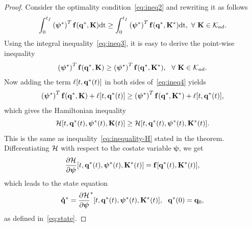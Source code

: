 \documentclass[
12pt,draftcls,onecolumn%
]{IEEEtran}
\begin{document}
\begin{proof}
Consider the optimality condition~\eqref{eq:ineq2} and rewriting it as follows
\begin{equation}
\begin{split}
\int_{0}^{t_f} \left(\boldsymbol{\psi}^*\right)^T{\bf f}({\bf q}^*,{\bf K})\mathrm{dt} \geq
\int_{0}^{t_f} \left(\boldsymbol{\psi}^*\right)^T{\bf f}({\bf q}^*,{\bf K}^*)\mathrm{dt},~\forall~{\bf K}\in {\cal K}_{ad}.
\end{split}
\label{eq:ineq3}
\end{equation}
Using the integral inequality~\eqref{eq:ineq3}, it is easy to derive the point-wise inequality~\cite{Ahmed2006}
\begin{equation}
\begin{split}
\left(\boldsymbol{\psi}^*\right)^T{\bf f}({\bf q}^*,{\bf K}) \geq
\left(\boldsymbol{\psi}^*\right)^T{\bf f}({\bf q}^*,{\bf K}^*),~~\forall~{\bf K}\in {\cal K}_{ad}.
\end{split}
\label{eq:ineq4}
\end{equation}
Now adding the term $\ell[t,{\bf q}^*(t)]$ in both sides of~\eqref{eq:ineq4} yields
%
\begin{equation*}
\begin{split}
\left(\boldsymbol{\psi}^*\right)^T{\bf f}({\bf q}^*,{\bf K}) +\ell[t,{\bf q}^*(t)]\geq
\left(\boldsymbol{\psi}^*\right)^T{\bf f}({\bf q}^*,{\bf K}^*) +\ell[t,{\bf q}^*(t)],
\end{split}
\end{equation*}
which gives the Hamiltonian inequality
\begin{equation*}
{\cal H}[t,{\bf q}^*(t),\boldsymbol{\psi}^*(t),{\bf K}(t)] \geq{\cal H}[t,{\bf q}^*(t),\boldsymbol{\psi}^*(t),{\bf K}^*(t)].
\end{equation*}
This is the same as inequality~\eqref{eq:inequality-H} stated in the theorem. Differentiating ${\cal H}$ with respect to the costate variable $\boldsymbol{\psi}$, we get
\begin{equation*}
\frac{\partial{\cal H}}{\partial\boldsymbol{\psi}}[t,{\bf q}^*(t),\boldsymbol{\psi}^*(t),{\bf K}^*(t)] = {\bf f}[{\bf q}^*(t),{\bf K}^*(t)],
\end{equation*}
which leads to the state equation
\begin{equation*}
{\bf \dot q}^* = \frac{\partial{\cal H}}{\partial\boldsymbol{\psi}}^* [t,{\bf q}^*(t),\boldsymbol{\psi}^*(t),{\bf K}^*(t)],~~{\bf q}^*(0)={\bf q}_0,
\end{equation*}
as defined in~\eqref{eq:state}.


\end{proof}
\end{document}
